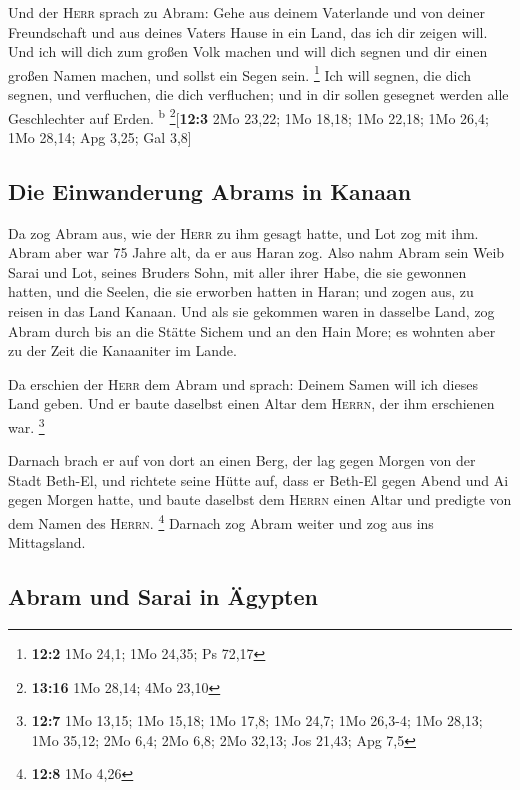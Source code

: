  Und der \textsc{Herr} sprach zu Abram: Gehe aus deinem
Vaterlande und von deiner Freundschaft und aus deines Vaters Hause in
ein Land, das ich dir zeigen will.  Und ich will dich zum
großen Volk machen und will dich segnen und dir einen großen Namen
machen, und sollst ein Segen sein. \footnote{\textbf{12:2} 1Mo 24,1; 1Mo
  24,35; Ps 72,17}  Ich will segnen, die dich segnen, und
verfluchen, die dich verfluchen; und in dir sollen gesegnet werden alle
Geschlechter auf Erden. \textsuperscript{b} \footnote{\textbf{13:16} 1Mo
  28,14; 4Mo 23,10}{[}\textbf{12:3} 2Mo 23,22; 1Mo 18,18; 1Mo 22,18; 1Mo
26,4; 1Mo 28,14; Apg 3,25; Gal 3,8{]}

\hypertarget{die-einwanderung-abrams-in-kanaan}{%
\subsection{Die Einwanderung Abrams in
Kanaan}\label{die-einwanderung-abrams-in-kanaan}}

 Da zog Abram aus, wie der \textsc{Herr} zu ihm gesagt
hatte, und Lot zog mit ihm. Abram aber war 75 Jahre alt, da er aus Haran
zog.  Also nahm Abram sein Weib Sarai und Lot, seines
Bruders Sohn, mit aller ihrer Habe, die sie gewonnen hatten, und die
Seelen, die sie erworben hatten in Haran; und zogen aus, zu reisen in
das Land Kanaan. Und als sie gekommen waren in dasselbe Land,
 zog Abram durch bis an die Stätte Sichem und an den Hain
More; es wohnten aber zu der Zeit die Kanaaniter im Lande.

 Da erschien der \textsc{Herr} dem Abram und sprach:
Deinem Samen will ich dieses Land geben. Und er baute daselbst einen
Altar dem \textsc{Herrn}, der ihm erschienen war. \footnote{\textbf{12:7}
  1Mo 13,15; 1Mo 15,18; 1Mo 17,8; 1Mo 24,7; 1Mo 26,3-4; 1Mo 28,13; 1Mo
  35,12; 2Mo 6,4; 2Mo 6,8; 2Mo 32,13; Jos 21,43; Apg 7,5}

 Darnach brach er auf von dort an einen Berg, der lag
gegen Morgen von der Stadt Beth-El, und richtete seine Hütte auf, dass
er Beth-El gegen Abend und Ai gegen Morgen hatte, und baute daselbst dem
\textsc{Herrn} einen Altar und predigte von dem Namen des
\textsc{Herrn}. \footnote{\textbf{12:8} 1Mo 4,26}  Darnach
zog Abram weiter und zog aus ins Mittagsland.

\hypertarget{abram-und-sarai-in-uxe4gypten}{%
\subsection{Abram und Sarai in
Ägypten}\label{abram-und-sarai-in-uxe4gypten}}

